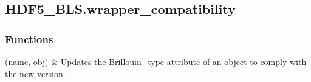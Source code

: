 \documentclass[letterpaper,10pt,english]{sphinxmanual}
\begin{document}

\begin{fulllineitems}
\label{\detokenize{_autosummary/HDF5_BLS.wrapper:HDF5_BLS.wrapper.is_tempfile}}
\pysigstartsignatures
\pysiglinewithargsret
{}
{}
{}
\pysigstopsignatures
\end{fulllineitems}


\sphinxstepscope


\subsection{HDF5\_BLS.wrapper\_compatibility}
\label{\detokenize{_autosummary/HDF5_BLS.wrapper_compatibility:module-HDF5_BLS.wrapper_compatibility}}\label{\detokenize{_autosummary/HDF5_BLS.wrapper_compatibility:hdf5-bls-wrapper-compatibility}}\label{\detokenize{_autosummary/HDF5_BLS.wrapper_compatibility::doc}}\subsubsection*{Functions}


\begin{savenotes}\sphinxattablestart
\sphinxthistablewithglobalstyle
\sphinxthistablewithnovlinesstyle
\centering
\begin{tabulary}{\linewidth}[t]{}
\sphinxtoprule
\sphinxtableatstartofbodyhook
\sphinxAtStartPar
{\hyperref[\detokenize{_autosummary/HDF5_BLS.wrapper_compatibility:HDF5_BLS.wrapper_compatibility.brillouin_type_update}]{}}(name, obj)
&
\sphinxAtStartPar
Updates the Brillouin\_type attribute of an object to comply with the new version.
\\
\sphinxbottomrule
\end{tabulary}
\sphinxtableafterendhook\par
\sphinxattableend\end{savenotes}
\end{document}
